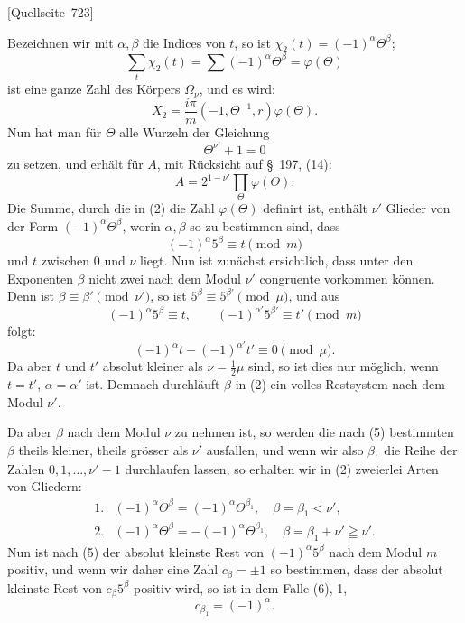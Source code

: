 \documentclass[11pt]{article}
\newcommand{\srcpage}[1]{\par\medskip\noindent\textsf{[Quellseite~#1]}\par\smallskip}
\begin{document}
\srcpage{723}
Bezeichnen wir mit $\alpha,\beta$ die Indices von $t$, so ist $\chi_2(t)=(-1)^\alpha\Theta^\beta$;
\begin{equation}
\sum_t\chi_2(t)=\sum(-1)^\alpha\Theta^\beta=\varphi(\Theta)
\tag{2}
\end{equation}
ist eine ganze Zahl des Körpers $\Omega_\nu$, und es wird:
\[
X_2=\frac{i\pi}{m}(-1,\Theta^{-1},r)\varphi(\Theta).
\]
Nun hat man für $\Theta$ alle Wurzeln der Gleichung
\begin{equation}
\Theta^{\nu'}+1=0
\tag{3}
\end{equation}
zu setzen, und erhält für $A$, mit Rücksicht auf \S~197, (14):
\begin{equation}
A=2^{1-\nu'}\prod_\Theta\varphi(\Theta).
\tag{4}
\end{equation}
Die Summe, durch die in (2) die Zahl $\varphi(\Theta)$ definirt ist, enthält $\nu'$ Glieder von der Form $(-1)^\alpha\Theta^\beta$, worin $\alpha,\beta$ so zu bestimmen sind, dass
\begin{equation}
(-1)^\alpha5^\beta\equiv t\pmod m
\tag{5}
\end{equation}
und $t$ zwischen 0 und $\nu$ liegt. Nun ist zunächst ersichtlich, dass unter den Exponenten $\beta$ nicht zwei nach dem Modul $\nu'$ congruente vorkommen können. Denn ist $\beta\equiv\beta'\pmod{\nu'}$, so ist $5^\beta\equiv5^{\beta'}\pmod\mu$, und aus
\[
(-1)^\alpha5^\beta\equiv t,
\qquad
(-1)^{\alpha'}5^{\beta'}\equiv t'\pmod m
\]
folgt:
\[
(-1)^\alpha t-(-1)^{\alpha'}t'\equiv0\pmod\mu.
\]
Da aber $t$ und $t'$ absolut kleiner als $\nu=\frac12\mu$ sind, so ist dies nur möglich, wenn $t=t'$, $\alpha=\alpha'$ ist. Demnach durchläuft $\beta$ in (2) ein volles Restsystem nach dem Modul $\nu'$.

Da aber $\beta$ nach dem Modul $\nu$ zu nehmen ist, so werden die nach (5) bestimmten $\beta$ theils kleiner, theils grösser als $\nu'$ ausfallen, und wenn wir also $\beta_1$ die Reihe der Zahlen $0,1,\ldots,\nu'-1$ durchlaufen lassen, so erhalten wir in (2) zweierlei Arten von Gliedern:
\begin{equation}
\begin{array}{ll}
1. & (-1)^\alpha\Theta^\beta=(-1)^\alpha\Theta^{\beta_1},\quad \beta=\beta_1<\nu',\\[1mm]
2. & (-1)^\alpha\Theta^\beta=-(-1)^\alpha\Theta^{\beta_1},\quad \beta=\beta_1+\nu'\geqq\nu'.
\end{array}
\tag{6}
\end{equation}
Nun ist nach (5) der absolut kleinste Rest von $(-1)^\alpha5^\beta$ nach dem Modul $m$ positiv, und wenn wir daher eine Zahl $c_\beta=\pm1$ so bestimmen, dass der absolut kleinste Rest von $c_\beta5^\beta$ positiv wird, so ist in dem Falle (6), 1,
\[
c_{\beta_1}=(-1)^\alpha.
\]
\end{document}
